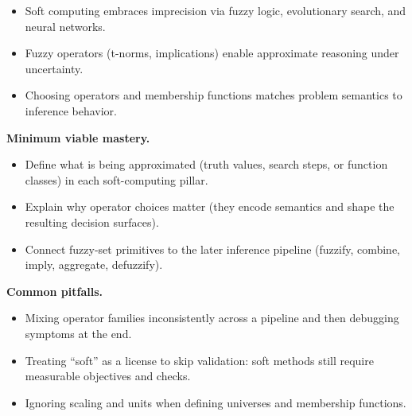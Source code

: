\begin{tcolorbox}[summarybox, title={Key takeaways}]
\begin{itemize}
    \item Soft computing embraces imprecision via fuzzy logic, evolutionary search, and neural networks.
    \item Fuzzy operators (t\hyp{}norms, implications) enable approximate reasoning under uncertainty.
    \item Choosing operators and membership functions matches problem semantics to inference behavior.
\end{itemize}

\medskip
\noindent\textbf{Minimum viable mastery.}
\begin{itemize}
    \item Define what is being approximated (truth values, search steps, or function classes) in each soft-computing pillar.
    \item Explain why operator choices matter (they encode semantics and shape the resulting decision surfaces).
    \item Connect fuzzy-set primitives to the later inference pipeline (fuzzify, combine, imply, aggregate, defuzzify).
\end{itemize}

\noindent\textbf{Common pitfalls.}
\begin{itemize}
    \item Mixing operator families inconsistently across a pipeline and then debugging symptoms at the end.
    \item Treating ``soft'' as a license to skip validation: soft methods still require measurable objectives and checks.
    \item Ignoring scaling and units when defining universes and membership functions.
\end{itemize}
\end{tcolorbox}

